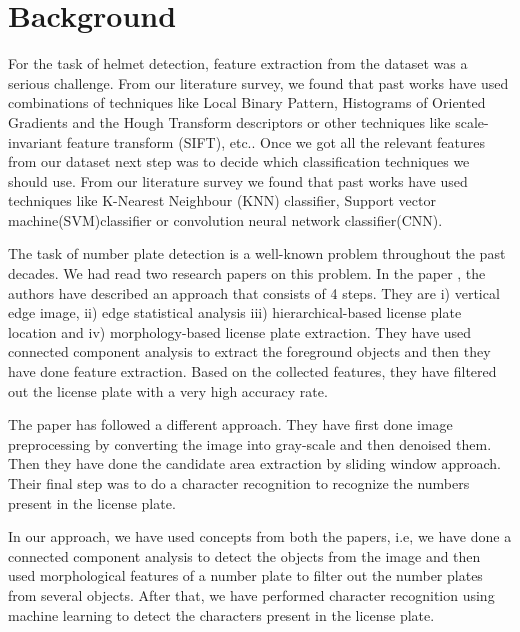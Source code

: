 \chapter{Background}
For the task of helmet detection, feature extraction from the dataset was a serious challenge. From our literature survey, we found that past works have used combinations of techniques like Local Binary Pattern, Histograms of Oriented Gradients and the Hough Transform descriptors\cite{b5} or other techniques like scale-invariant feature transform (SIFT), etc.\cite{b5}. Once we got all the relevant features from our dataset next step was to decide which classification techniques we should use. From our literature survey we found that past works have used techniques like K-Nearest Neighbour (KNN) classifier\cite{b6}, Support vector machine(SVM)classifier\cite{b6} or convolution neural network classifier(CNN)\cite{b8}.
\par The task of number plate detection is a well-known problem throughout the past decades. We had read two research papers on this problem. In the paper \cite{b3}, the authors have described an approach that consists of 4 steps. They are i) vertical edge image, ii) edge statistical analysis iii) hierarchical-based license plate location and iv) morphology-based license plate extraction. They have used connected component analysis to extract the foreground objects and then they have done feature extraction. Based on the collected features, they have filtered out the license plate with a very high accuracy rate. 
\par The paper \cite{b4} has followed a different approach. They have first done image preprocessing by converting the image into gray-scale and then denoised them. Then they have done the candidate area extraction by sliding window approach. Their final step was to do a character recognition to recognize the numbers present in the license plate. 
\par In our approach, we have used concepts from both the papers, i.e, we have done a connected component analysis to detect the objects from the image and then used morphological features of a number plate to filter out the number plates from several objects. After that, we have performed character recognition using machine learning to detect the characters present in the license plate.
